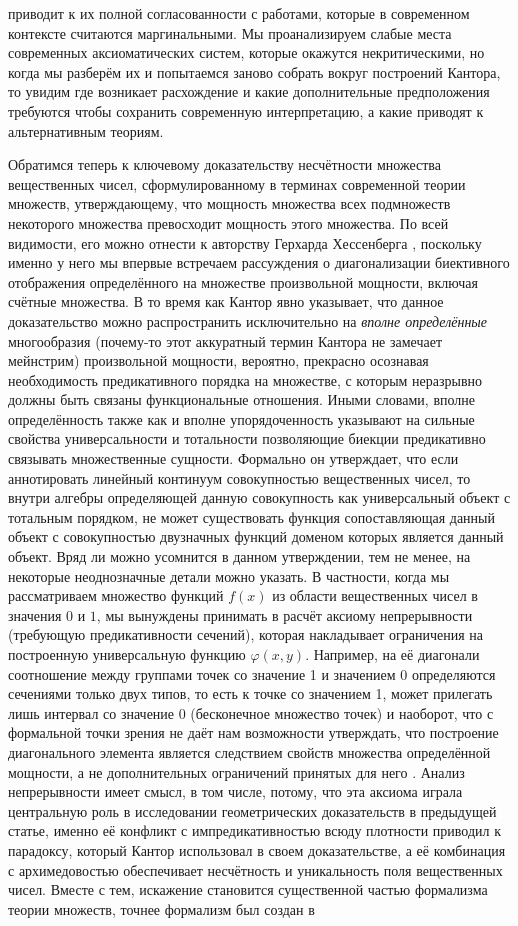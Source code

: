 \documentclass[12pt]{article}
\begin{document}
приводит к их полной согласованности с работами, которые в современном контексте считаются маргинальными. Мы проанализируем слабые места современных аксиоматических систем, которые окажутся некритическими, но когда мы разберём их и попытаемся заново собрать вокруг построений Кантора, то увидим где возникает расхождение и какие дополнительные предположения требуются чтобы сохранить современную интерпретацию, а какие приводят к альтернативным теориям.

Обратимся теперь к ключевому доказательству несчётности множества вещественных чисел, сформулированному в терминах современной теории множеств, утверждающему, что мощность множества всех подмножеств некоторого множества превосходит мощность этого множества. По всей видимости, его можно отнести к авторству Герхарда Хессенберга \cite{hessenberg}, поскольку именно у него мы впервые встречаем рассуждения о диагонализации биективного отображения определённого на множестве произвольной мощности, включая счётные множества. В то время как Кантор явно указывает, что данное доказательство можно распространить исключительно на {\it вполне определённые} многообразия (почему-то этот аккуратный термин Кантора не замечает мейнстрим) произвольной мощности, вероятно, прекрасно осознавая необходимость предикативного порядка на множестве, с которым неразрывно должны быть связаны функциональные отношения. Иными словами, вполне определённость также как и вполне упорядоченность указывают на сильные свойства универсальности и тотальности позволяющие биекции предикативно связывать множественные сущности. Формально он утверждает, что если аннотировать линейный континуум совокупностью вещественных чисел, то внутри алгебры определяющей данную совокупность как универсальный объект с тотальным порядком, не может существовать функция сопоставляющая данный объект с совокупностью двузначных функций доменом которых является данный объект. Вряд ли можно усомнится в данном утверждении, тем не менее, на некоторые неоднозначные детали можно указать. В частности, когда мы рассматриваем множество функций $f(x)$ из области вещественных чисел в значения $0$ и $1$, мы вынуждены принимать в расчёт аксиому непрерывности (требующую предикативности сечений), которая накладывает ограничения на построенную универсальную функцию $\varphi(x, y)$. Например, на её диагонали соотношение между группами точек со значение 1 и значением 0 определяются сечениями только двух типов, то есть к точке со значением 1, может прилегать лишь интервал со значение 0 (бесконечное множество точек) и наоборот, что с формальной точки зрения не даёт нам возможности утверждать, что построение диагонального элемента является следствием свойств множества определённой мощности, а не дополнительных ограничений принятых для него \cite{diagonal}. Анализ непрерывности имеет смысл, в том числе, потому, что эта аксиома играла центральную роль в исследовании геометрических доказательств в предыдущей статье, именно её конфликт с импредикативностью всюду плотности приводил к парадоксу, который Кантор использовал в своем доказательстве, а её комбинация с архимедовостью обеспечивает несчётность и уникальность поля вещественных чисел. Вместе с тем, искажение становится существенной частью формализма теории множеств, точнее формализм был создан в 
\end{document}
